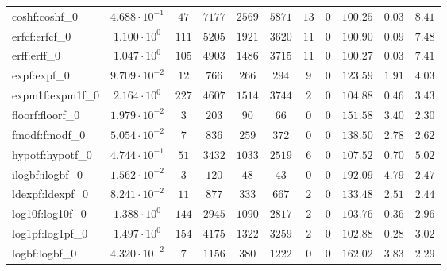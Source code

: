 \begin{tabular}{|l|c|c|c|c|c|c|c|c|c|c|}
coshf:coshf\_0               & $ 4.688 \cdot 10^{-1} $ & $ 47     $ & $ 7177   $ & $ 2569  $ & $ 5871  $ & $ 13  $ & $ 0 $ & $ 100.25      $ & $ 0.03    $ & $ 8.41    $ \\
erfcf:erfcf\_0               & $ 1.100 \cdot 10^{0}  $ & $ 111    $ & $ 5205   $ & $ 1921  $ & $ 3620  $ & $ 11  $ & $ 0 $ & $ 100.90      $ & $ 0.09    $ & $ 7.48    $ \\
erff:erff\_0                 & $ 1.047 \cdot 10^{0}  $ & $ 105    $ & $ 4903   $ & $ 1486  $ & $ 3715  $ & $ 11  $ & $ 0 $ & $ 100.27      $ & $ 0.03    $ & $ 7.41    $ \\
expf:expf\_0                 & $ 9.709 \cdot 10^{-2} $ & $ 12     $ & $ 766    $ & $ 266   $ & $ 294   $ & $ 9   $ & $ 0 $ & $ 123.59      $ & $ 1.91    $ & $ 4.03    $ \\
expm1f:expm1f\_0             & $ 2.164 \cdot 10^{0}  $ & $ 227    $ & $ 4607   $ & $ 1514  $ & $ 3744  $ & $ 2   $ & $ 0 $ & $ 104.88      $ & $ 0.46    $ & $ 3.43    $ \\
floorf:floorf\_0             & $ 1.979 \cdot 10^{-2} $ & $ 3      $ & $ 203    $ & $ 90    $ & $ 66    $ & $ 0   $ & $ 0 $ & $ 151.58      $ & $ 3.40    $ & $ 2.30    $ \\
fmodf:fmodf\_0               & $ 5.054 \cdot 10^{-2} $ & $ 7      $ & $ 836    $ & $ 259   $ & $ 372   $ & $ 0   $ & $ 0 $ & $ 138.50      $ & $ 2.78    $ & $ 2.62    $ \\
hypotf:hypotf\_0             & $ 4.744 \cdot 10^{-1} $ & $ 51     $ & $ 3432   $ & $ 1033  $ & $ 2519  $ & $ 6   $ & $ 0 $ & $ 107.52      $ & $ 0.70    $ & $ 5.02    $ \\
ilogbf:ilogbf\_0             & $ 1.562 \cdot 10^{-2} $ & $ 3      $ & $ 120    $ & $ 48    $ & $ 43    $ & $ 0   $ & $ 0 $ & $ 192.09      $ & $ 4.79    $ & $ 2.47    $ \\
ldexpf:ldexpf\_0             & $ 8.241 \cdot 10^{-2} $ & $ 11     $ & $ 877    $ & $ 333   $ & $ 667   $ & $ 2   $ & $ 0 $ & $ 133.48      $ & $ 2.51    $ & $ 2.44    $ \\
log10f:log10f\_0             & $ 1.388 \cdot 10^{0}  $ & $ 144    $ & $ 2945   $ & $ 1090  $ & $ 2817  $ & $ 2   $ & $ 0 $ & $ 103.76      $ & $ 0.36    $ & $ 2.96    $ \\
log1pf:log1pf\_0             & $ 1.497 \cdot 10^{0}  $ & $ 154    $ & $ 4175   $ & $ 1322  $ & $ 3259  $ & $ 2   $ & $ 0 $ & $ 102.88      $ & $ 0.28    $ & $ 3.02    $ \\
logbf:logbf\_0               & $ 4.320 \cdot 10^{-2} $ & $ 7      $ & $ 1156   $ & $ 380   $ & $ 1222  $ & $ 0   $ & $ 0 $ & $ 162.02      $ & $ 3.83    $ & $ 2.29    $ \\

\end{tabular}
